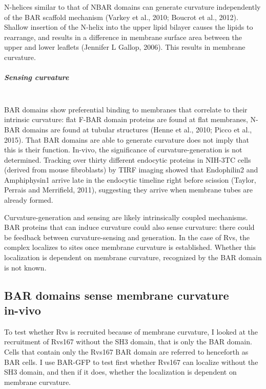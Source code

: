 N-helices similar to that of NBAR domains can generate curvature independently of the BAR scaffold mechanism (Varkey et al., 2010; Boucrot et al., 2012). Shallow insertion of the N-helix into the upper lipid bilayer causes the lipids to rearrange, and results in a difference in membrane surface area between the upper and lower leaflets (Jennifer L Gallop, 2006). This results in membrane curvature. 


	
	\vspace{5mm}
	
				\subparagraph{Sensing curvature }
								\mbox{}\\
BAR domains show preferential binding to membranes that correlate to their intrinsic curvature: flat F-BAR domain proteins are found at flat membranes, N-BAR domains are found at tubular structures (Henne et al., 2010; Picco et al., 2015). That BAR domains are able to generate curvature does not imply that this is their function. In-vivo, the significance of curvature-generation is not determined. Tracking over thirty different endocytic proteins in NIH-3TC cells (derived from mouse fibroblasts) by TIRF imaging showed that Endophilin2 and Amphiphysin1 arrive late in the endocytic timeline right before scission (Taylor, Perrais and Merrifield, 2011), suggesting they arrive when membrane tubes are already formed. 


	\vspace{5mm}
Curvature-generation and sensing are likely intrinsically coupled mechanisms. BAR proteins that can induce curvature could also sense curvature: there could be feedback between curvature-sensing and generation. In the case of Rvs, the complex localizes to sites once membrane curvature is established. Whether this localization is dependent on membrane curvature, recognized by the BAR domain is not known. 


\newpage

	\subsection{BAR domains sense membrane curvature \\ in-vivo}
\label{sub_curvature}

To test whether Rvs is recruited because of membrane curvature, I looked at the recruitment of Rvs167 without the SH3 domain, that is only the BAR domain. Cells that contain only the Rvs167 BAR domain are referred to henceforth as BAR cells. I use BAR-GFP to test first whether Rvs167 can localize without the SH3 domain, and then if it does, whether the localization is dependent on membrane curvature.

